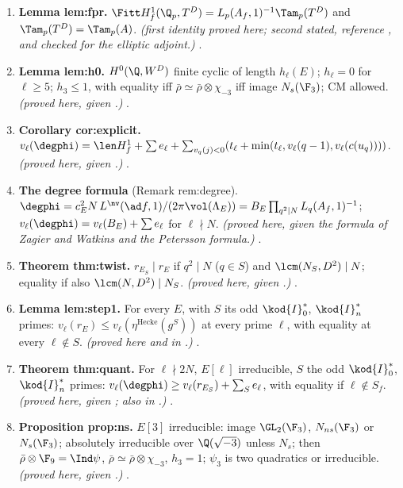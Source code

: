 \begin{sloppypar}
\begin{enumerate}[label=\textbf{\thechapter.\arabic*}]
\emph{(stated; reference; the paragraph after it proved here.)} .
\item \textbf{Lemma lem:fpr.} $\Fitt H^1_f(\Q_p,T^D)=L_p(A_f,1)^{-1}\Tam_p(T^D)$ and $\Tam_p(T^D)=\Tam_p(A)$. \emph{(first identity proved here; second stated, reference \cite[(57)]{DFG04}, and checked for the
elliptic adjoint.)} .
\item \textbf{Lemma lem:h0.} $H^0(\Q,W^D)$ finite cyclic of length $h_\ell(E)$; $h_\ell=0$ for $\ell\ge5$; $h_3\le1$, with equality iff $\bar\rho\simeq\bar\rho\otimes\chi_{-3}$ iff image $N_s(\F_3)$; CM allowed.
\emph{(proved here, given .)} .
\item \textbf{Corollary cor:explicit.} $v_\ell(\degphi)=\len H^1_f+\sum e_\ell+\sum_{v_q(j)<0}(t_\ell+\min(t_\ell,v_\ell(q-1),v_\ell(c(u_q))))$. \emph{(proved here, given .)}
.
\item \textbf{The degree formula} (Remark rem:degree). $\degphi=c_E^2N\,L^{\nv}(\ad f,1)/(2\pi\vol(\Lambda_E))=B_E\prod_{q^2\mid N}L_q(A_f,1)^{-1}$; $v_\ell(\degphi)=v_\ell(B_E)+\sum e_\ell$ for $\ell\nmid N$.
\emph{(proved here, given the formula of Zagier and Watkins and the Petersson formula.)} .
\item \textbf{Theorem thm:twist.} $r_{E_S}\mid r_E$ if $q^2\mid N$ ($q\in S$) and $\lcm(N_S,D^2)\mid N$; equality if also $\lcm(N,D^2)\mid N_S$. \emph{(proved here, given .)}
.
\item \textbf{Lemma lem:step1.} For every $E$, with $S$ its odd $\kod{I}_0^*$, $\kod{I}_n^*$ primes: $v_\ell(r_E)\le v_\ell(\eta^{\mathrm{Hecke}}(g^S))$ at every prime $\ell$, with equality at every $\ell\notin S$.
\emph{(proved here and in .)} .
\item \textbf{Theorem thm:quant.} For $\ell\nmid2N$, $E[\ell]$ irreducible, $S$ the odd $\kod{I}_0^*$, $\kod{I}_n^*$ primes: $v_\ell(\degphi)\ge v_\ell(r_{E_S})+\sum_Se_\ell$, with equality if $\ell\notin S_f$.
\emph{(proved here, given ; also in .)} .
\item \textbf{Proposition prop:ns.} $E[3]$ irreducible: image $\GL_2(\F_3)$, $N_{ns}(\F_3)$ or $N_s(\F_3)$; absolutely irreducible over $\Q(\sqrt{-3})$ unless $N_s$; then $\bar\rho\otimes\F_9=\Ind\psi$, $\bar\rho\simeq\bar\rho\otimes\chi_{-3}$,
$h_3=1$; $\psi_3$ is two quadratics or irreducible. \emph{(proved here, given .)} .

\end{enumerate}
\end{sloppypar}
